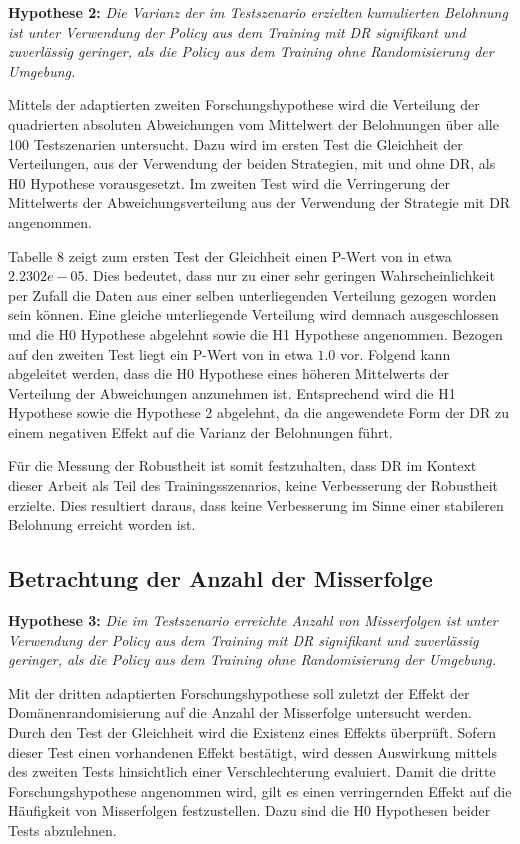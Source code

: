 \textbf{Hypothese 2:}
\textit{Die Varianz der im Testszenario erzielten kumulierten Belohnung ist unter Verwendung der Policy aus dem Training mit DR signifikant und zuverlässig geringer, als die Policy aus dem Training ohne Randomisierung der Umgebung.}

Mittels der adaptierten zweiten Forschungshypothese wird die Verteilung der quadrierten absoluten Abweichungen vom Mittelwert der Belohnungen über alle 100 Testszenarien untersucht.
Dazu wird im ersten Test die Gleichheit der Verteilungen, aus der Verwendung der beiden Strategien, mit und ohne DR, als H0 Hypothese vorausgesetzt.
Im zweiten Test wird die Verringerung der Mittelwerts der Abweichungsverteilung aus der Verwendung der Strategie mit DR angenommen.

Tabelle 8 zeigt zum ersten Test der Gleichheit einen P-Wert von in etwa $2.2302e-05$.
Dies bedeutet, dass nur zu einer sehr geringen Wahrscheinlichkeit per Zufall die Daten aus einer selben unterliegenden Verteilung gezogen worden sein können.
Eine gleiche unterliegende Verteilung wird demnach ausgeschlossen und die H0 Hypothese abgelehnt sowie die H1 Hypothese angenommen.
Bezogen auf den zweiten Test liegt ein P-Wert von in etwa $1.0$ vor.
Folgend kann abgeleitet werden, dass die H0 Hypothese eines höheren Mittelwerts der Verteilung der Abweichungen anzunehmen ist.
Entsprechend wird die H1 Hypothese sowie die Hypothese 2 abgelehnt, da die angewendete Form der DR zu einem negativen Effekt auf die Varianz der Belohnungen führt.

Für die Messung der Robustheit ist somit festzuhalten, dass DR im Kontext dieser Arbeit als Teil des Trainingsszenarios, keine Verbesserung der Robustheit erzielte.
Dies resultiert daraus, dass keine Verbesserung im Sinne einer stabileren Belohnung erreicht worden ist.

\subsection{Betrachtung der Anzahl der Misserfolge}

\textbf{Hypothese 3:}
\textit{Die im Testszenario erreichte Anzahl von Misserfolgen ist unter Verwendung der Policy aus dem Training mit DR signifikant und zuverlässig geringer, als die Policy aus dem Training ohne Randomisierung der Umgebung.}

Mit der dritten adaptierten Forschungshypothese soll zuletzt der Effekt der Domänenrandomisierung auf die Anzahl der Misserfolge untersucht werden.
Durch den Test der Gleichheit wird die Existenz eines Effekts überprüft.
Sofern dieser Test einen vorhandenen Effekt bestätigt, wird dessen Auswirkung mittels des zweiten Tests hinsichtlich einer Verschlechterung evaluiert.
Damit die dritte Forschungshypothese angenommen wird, gilt es einen verringernden Effekt auf die Häufigkeit von Misserfolgen festzustellen.
Dazu sind die H0 Hypothesen beider Tests abzulehnen.

